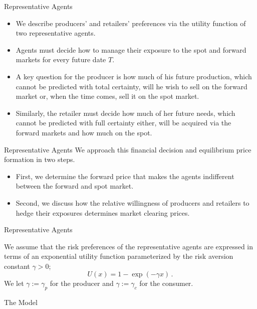 {Representative Agents}

\begin{itemize}
\item<1-> We describe producers' and retailers'
preferences via the utility function of two representative agents.
\item<2-> Agents
must decide how to manage their exposure to the spot and forward
markets for every future date $T$.
\item<3->
A key question for the producer
is how much of his future production, which cannot be predicted with
total certainty, will he wish to sell on the forward market or, when
the time comes, sell it on the spot market.
\item<4-> Similarly, the retailer
must decide how much of her future needs, which cannot be predicted
with full certainty either, will be acquired via the forward markets
and how much on the spot.
\end{itemize}



{Representative Agents}
We approach this financial decision and
equilibrium price formation in two steps.

\begin{itemize}
\item<1-> First, we determine the
forward price that makes the agents indifferent between the forward
and spot market.
\item<2-> Second, we discuss how the relative willingness
of producers and retailers to hedge their exposures determines
market clearing prices.
\end{itemize}





{Representative Agents}

We assume that the risk preferences of the representative agents are
expressed in terms of an exponential utility function parameterized
by the risk aversion constant $\gamma>0$;
$$
U(x)=1-\exp(-\gamma x)\,.
$$
We let $\gamma:=\gamma_p$ for the producer and $\gamma:=\gamma_c$
for the consumer.





{The Model}

